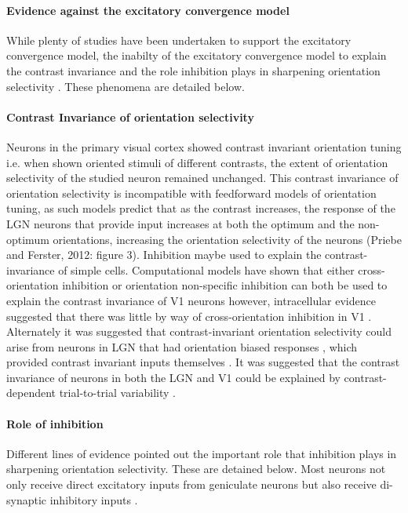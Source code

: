 \paragraph{Evidence against the excitatory convergence model}

While plenty of studies have been undertaken to support the excitatory convergence model, the inabilty of the excitatory convergence model to explain the contrast invariance \cite{Sclar1982} and the role inhibition plays in sharpening orientation selectivity \cite{Creutzfeldt1974, Sillito1975}. These phenomena are detailed below.
 
\paragraph{Contrast Invariance of orientation selectivity}

Neurons in the primary visual cortex showed contrast invariant orientation tuning \cite{Sclar1982, Skottun1987, Alitto2004} i.e. when shown oriented stimuli of different contrasts, the extent of orientation selectivity of the studied neuron remained unchanged. This contrast invariance of orientation selectivity is incompatible with feedforward models of orientation tuning, as such models predict that as the contrast increases, the response of the LGN neurons that provide input increases at both the optimum and the non-optimum orientations, increasing the orientation selectivity of the neurons (Priebe and Ferster, 2012: figure 3). Inhibition maybe used to explain the contrast-invariance of simple cells. Computational models have shown that either cross-orientation inhibition \cite{Troyer1998} or orientation non-specific inhibition \cite{Ben-Yishai1995, Somers1995, Sompolinsky1997} can both be used to explain the contrast invariance of V1 neurons however, intracellular evidence suggested that there was little by way of cross-orientation inhibition in V1 \cite{Anderson2000}. Alternately it was suggested that contrast-invariant orientation selectivity could arise from neurons in LGN that had orientation biased responses \cite{Vidyasagar1982}, which provided contrast invariant inputs themselves \cite{Naito2013, Viswanathan2015}. It was suggested that the contrast invariance of neurons in both the LGN and V1 could be explained by contrast-dependent trial-to-trial variability \cite{Finn2007, Sadagopan2012, Priebe2012, Viswanathan2015}.


\paragraph{Role of inhibition}
Different lines of evidence pointed out the important role that inhibition plays in sharpening orientation selectivity. These are detained below. Most neurons not only receive direct excitatory inputs from geniculate neurons but also receive di-synaptic inhibitory inputs \cite{Creutzfeldt1968, Ferster1983}.


